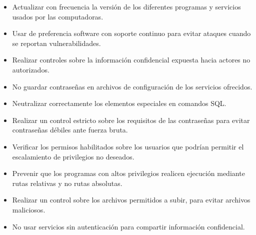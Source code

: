 \documentclass[a4paper]{article}
\begin{document}
\begin{itemize}
    \item Actualizar con frecuencia la versión de los diferentes programas y servicios usados por las computadoras.
    \item Usar de preferencia software con soporte continuo para evitar ataques cuando se reportan vulnerabilidades.
    \item Realizar controles sobre la información confidencial expuesta hacia actores no autorizados.
    \item No guardar contraseñas en archivos de configuración de los servicios ofrecidos.
    \item Neutralizar correctamente los elementos especiales en comandos SQL.
    \item Realizar un control estricto sobre los requisitos de las contraseñas para evitar contraseñas débiles ante fuerza bruta.
    \item Verificar los permisos habilitados sobre los usuarios que podrían permitir el escalamiento de privilegios no deseados.
    \item Prevenir que los programas con altos privilegios realicen ejecución mediante rutas relativas y no rutas absolutas.
    \item Realizar un control sobre los archivos permitidos a subir, para evitar archivos maliciosos.
    \item No usar servicios sin autenticación para compartir información confidencial.
\end{itemize}
\clearpage
\end{document}
